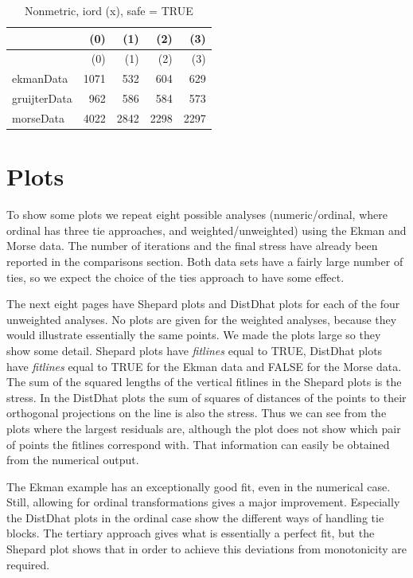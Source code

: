 \documentclass[
  12pt,
  letterpaper,
  DIV=11,
  numbers=noendperiod]{scrartcl}
\begin{document}
\begin{longtable}[]{@{}lrrrr@{}}
\caption{Nonmetric, iord (x), safe = TRUE}\tabularnewline
\toprule\noalign{}
& (0) & (1) & (2) & (3) \\
\midrule\noalign{}
\endfirsthead
\toprule\noalign{}
& (0) & (1) & (2) & (3) \\
\midrule\noalign{}
\endhead
\bottomrule\noalign{}
\endlastfoot
ekmanData & 1071 & 532 & 604 & 629 \\
gruijterData & 962 & 586 & 584 & 573 \\
morseData & 4022 & 2842 & 2298 & 2297 \\
\end{longtable}

\section{Plots}\label{plots}

To show some plots we repeat eight possible analyses (numeric/ordinal,
where ordinal has three tie approaches, and weighted/unweighted) using
the Ekman and Morse data. The number of iterations and the final stress
have already been reported in the comparisons section. Both data sets
have a fairly large number of ties, so we expect the choice of the ties
approach to have some effect.

The next eight pages have Shepard plots and DistDhat plots for each of
the four unweighted analyses. No plots are given for the weighted
analyses, because they would illustrate essentially the same points. We
made the plots large so they show some detail. Shepard plots have
\emph{fitlines} equal to TRUE, DistDhat plots have \emph{fitlines} equal
to TRUE for the Ekman data and FALSE for the Morse data. The sum of the
squared lengths of the vertical fitlines in the Shepard plots is the
stress. In the DistDhat plots the sum of squares of distances of the
points to their orthogonal projections on the line is also the stress.
Thus we can see from the plots where the largest residuals are, although
the plot does not show which pair of points the fitlines correspond
with. That information can easily be obtained from the numerical output.

The Ekman example has an exceptionally good fit, even in the numerical
case. Still, allowing for ordinal transformations gives a major
improvement. Especially the DistDhat plots in the ordinal case show the
different ways of handling tie blocks. The tertiary approach gives what
is essentially a perfect fit, but the Shepard plot shows that in order
to achieve this deviations from monotonicity are required.
\end{document}
